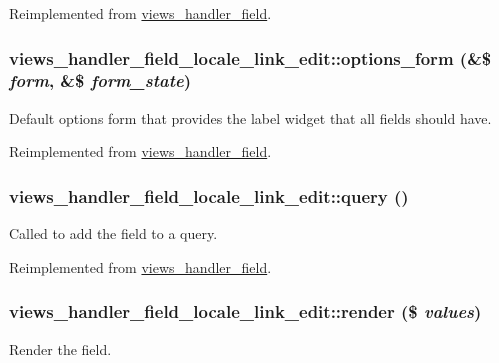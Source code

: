 Reimplemented from \hyperlink{classviews__handler__field_a3d50050864c255b71c842972a45d39f6}{views\_\-handler\_\-field}.\hypertarget{classviews__handler__field__locale__link__edit_adcbd4b327f8cbcd2d75e0c145b00e42d}{
\subsubsection[{options\_\-form}]{\setlength{\rightskip}{0pt plus 5cm}views\_\-handler\_\-field\_\-locale\_\-link\_\-edit::options\_\-form (\&\$ {\em form}, \/  \&\$ {\em form\_\-state})}}
\label{classviews__handler__field__locale__link__edit_adcbd4b327f8cbcd2d75e0c145b00e42d}
Default options form that provides the label widget that all fields should have. 

Reimplemented from \hyperlink{classviews__handler__field_a0435d161922b7b4b84f02a2e79bb947a}{views\_\-handler\_\-field}.\hypertarget{classviews__handler__field__locale__link__edit_ada85b88e681ca38a7c7d66deb133ae65}{
\subsubsection[{query}]{\setlength{\rightskip}{0pt plus 5cm}views\_\-handler\_\-field\_\-locale\_\-link\_\-edit::query ()}}
\label{classviews__handler__field__locale__link__edit_ada85b88e681ca38a7c7d66deb133ae65}
Called to add the field to a query. 

Reimplemented from \hyperlink{classviews__handler__field_a4f661f91bcbe80d4a00c30a31456c502}{views\_\-handler\_\-field}.\hypertarget{classviews__handler__field__locale__link__edit_aea9a4b5bf4281c17e787bae9fee408bd}{
\subsubsection[{render}]{\setlength{\rightskip}{0pt plus 5cm}views\_\-handler\_\-field\_\-locale\_\-link\_\-edit::render (\$ {\em values})}}
\label{classviews__handler__field__locale__link__edit_aea9a4b5bf4281c17e787bae9fee408bd}
Render the field.


